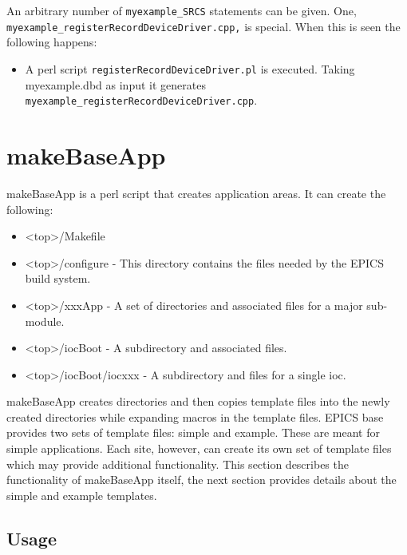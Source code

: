 An arbitrary number of \verb|myexample_SRCS| statements can be given. One, 
\verb|myexample_registerRecordDeviceDriver.cpp,| is special. When this is seen the following happens:

\begin{itemize}\item A perl script \verb|registerRecordDeviceDriver.pl| is executed. Taking myexample.dbd as input it generates 
\verb|myexample_registerRecordDeviceDriver.cpp|.

\end{itemize}\section{makeBaseApp}

makeBaseApp is a perl script that creates application areas. It can create the following:

\begin{itemize}\item \textless{}top\textgreater{}/Makefile

\item \textless{}top\textgreater{}/configure - This directory contains the files needed by the EPICS build system.

\item  \textless{}top\textgreater{}/xxxApp - A set of directories and associated files for a  major sub-module.

\item \textless{}top\textgreater{}/iocBoot - A subdirectory and associated files.

\item  \textless{}top\textgreater{}/iocBoot/iocxxx - A subdirectory and files for a single ioc.

\end{itemize}makeBaseApp creates directories and then copies template files into the newly created directories while expanding 
macros in the template files. EPICS base provides two sets of template files: simple and example. These are meant for 
simple applications. Each site, however, can create its own set of template files which may provide additional 
functionality. This section describes the functionality of makeBaseApp itself, the next section provides details about the 
simple and example templates.

\subsection{Usage}

